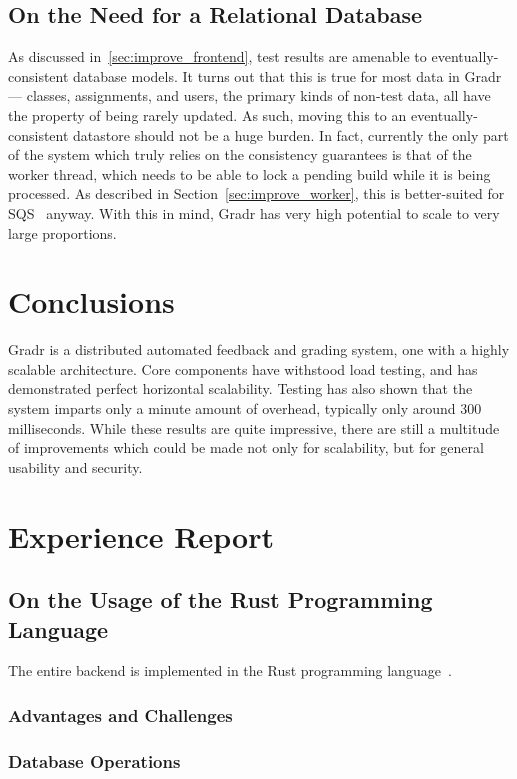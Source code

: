 \documentclass{scrartcl}
\begin{document}
\subsection{On the Need for a Relational Database}
As discussed in~\ref{sec:improve_frontend}, test results are amenable to eventually-consistent database models.
It turns out that this is true for most data in Gradr --- classes, assignments, and users, the primary kinds of non-test data, all have the property of being rarely updated.
As such, moving this to an eventually-consistent datastore should not be a huge burden.
In fact, currently the only part of the system which truly relies on the consistency guarantees is that of the worker thread, which needs to be able to lock a pending build while it is being processed.
As described in Section~\ref{sec:improve_worker}, this is better-suited for SQS~\cite{sqs} anyway.
With this in mind, Gradr has very high potential to scale to very large proportions.

\section{Conclusions}

Gradr is a distributed automated feedback and grading system, one with a highly scalable architecture.
Core components have withstood load testing, and has demonstrated perfect horizontal scalability.
Testing has also shown that the system imparts only a minute amount of overhead, typically only around 300 milliseconds.
While these results are quite impressive, there are still a multitude of improvements which could be made not only for scalability, but for general usability and security.

\appendix

\section{Experience Report}

\subsection{On the Usage of the Rust Programming Language}
The entire backend is implemented in the Rust programming language~\cite{rust}.

\subsubsection{Advantages and Challenges}
\subsubsection{Database Operations}
\end{document}
